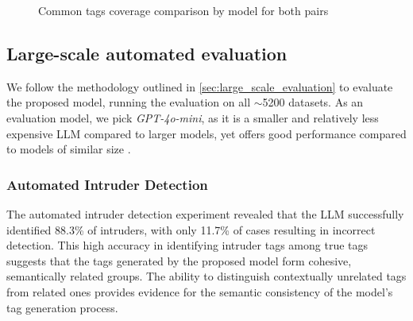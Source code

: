 \begin{figure}[h]
    \centering
    \hfill
    \caption{Common tags coverage comparison by model for both pairs}
    \label{fig:common_tags_coverage_comparison}
\end{figure}

\subsection{Large-scale automated evaluation}
We follow the methodology outlined in \cref{sec:large_scale_evaluation} to evaluate the proposed model, running the evaluation on all $\sim$5200 datasets. As an evaluation model, we pick \textit{GPT-4o-mini}, as it is a smaller and relatively less expensive LLM compared to larger models, yet offers good performance compared to models of similar size \cite{noauthor_gpt-4o_nodate}.

\subsubsection{Automated Intruder Detection}
The automated intruder detection experiment revealed that the LLM successfully identified 88.3\% of intruders, with only 11.7\% of cases resulting in incorrect detection. This high accuracy in identifying intruder tags among true tags suggests that the tags generated by the proposed model form cohesive, semantically related groups. The ability to distinguish contextually unrelated tags from related ones provides evidence for the semantic consistency of the model's tag generation process.

